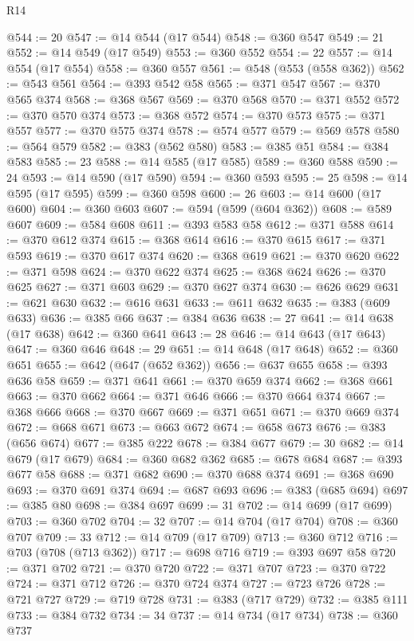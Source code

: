 \begin{lexlean}{R14}
\begin{coremodule}
@544 := 20
@547 := @14 @544 (@17 @544)
@548 := @360 @547
@549 := 21
@552 := @14 @549 (@17 @549)
@553 := @360 @552
@554 := 22
@557 := @14 @554 (@17 @554)
@558 := @360 @557
@561 := @548 (@553 (@558 @362))
@562 := @543 @561
@564 := @393 @542 @58
@565 := @371 @547
@567 := @370 @565 @374
@568 := @368 @567
@569 := @370 @568
@570 := @371 @552
@572 := @370 @570 @374
@573 := @368 @572
@574 := @370 @573
@575 := @371 @557
@577 := @370 @575 @374
@578 := @574 @577
@579 := @569 @578
@580 := @564 @579
@582 := @383 (@562 @580)
@583 := @385 @51
@584 := @384 @583
@585 := 23
@588 := @14 @585 (@17 @585)
@589 := @360 @588
@590 := 24
@593 := @14 @590 (@17 @590)
@594 := @360 @593
@595 := 25
@598 := @14 @595 (@17 @595)
@599 := @360 @598
@600 := 26
@603 := @14 @600 (@17 @600)
@604 := @360 @603
@607 := @594 (@599 (@604 @362))
@608 := @589 @607
@609 := @584 @608
@611 := @393 @583 @58
@612 := @371 @588
@614 := @370 @612 @374
@615 := @368 @614
@616 := @370 @615
@617 := @371 @593
@619 := @370 @617 @374
@620 := @368 @619
@621 := @370 @620
@622 := @371 @598
@624 := @370 @622 @374
@625 := @368 @624
@626 := @370 @625
@627 := @371 @603
@629 := @370 @627 @374
@630 := @626 @629
@631 := @621 @630
@632 := @616 @631
@633 := @611 @632
@635 := @383 (@609 @633)
@636 := @385 @66
@637 := @384 @636
@638 := 27
@641 := @14 @638 (@17 @638)
@642 := @360 @641
@643 := 28
@646 := @14 @643 (@17 @643)
@647 := @360 @646
@648 := 29
@651 := @14 @648 (@17 @648)
@652 := @360 @651
@655 := @642 (@647 (@652 @362))
@656 := @637 @655
@658 := @393 @636 @58
@659 := @371 @641
@661 := @370 @659 @374
@662 := @368 @661
@663 := @370 @662
@664 := @371 @646
@666 := @370 @664 @374
@667 := @368 @666
@668 := @370 @667
@669 := @371 @651
@671 := @370 @669 @374
@672 := @668 @671
@673 := @663 @672
@674 := @658 @673
@676 := @383 (@656 @674)
@677 := @385 @222
@678 := @384 @677
@679 := 30
@682 := @14 @679 (@17 @679)
@684 := @360 @682 @362
@685 := @678 @684
@687 := @393 @677 @58
@688 := @371 @682
@690 := @370 @688 @374
@691 := @368 @690
@693 := @370 @691 @374
@694 := @687 @693
@696 := @383 (@685 @694)
@697 := @385 @80
@698 := @384 @697
@699 := 31
@702 := @14 @699 (@17 @699)
@703 := @360 @702
@704 := 32
@707 := @14 @704 (@17 @704)
@708 := @360 @707
@709 := 33
@712 := @14 @709 (@17 @709)
@713 := @360 @712
@716 := @703 (@708 (@713 @362))
@717 := @698 @716
@719 := @393 @697 @58
@720 := @371 @702
@721 := @370 @720
@722 := @371 @707
@723 := @370 @722
@724 := @371 @712
@726 := @370 @724 @374
@727 := @723 @726
@728 := @721 @727
@729 := @719 @728
@731 := @383 (@717 @729)
@732 := @385 @111
@733 := @384 @732
@734 := 34
@737 := @14 @734 (@17 @734)
@738 := @360 @737

\end{coremodule}
\end{lexlean}
